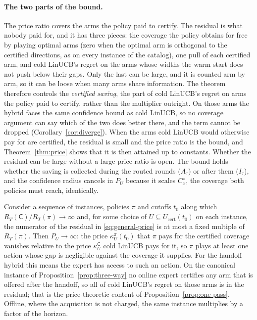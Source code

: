 \documentclass[anon]{alt2027} %
\newcommand{\Cold}{\mathsf{C}}
\begin{document}
\paragraph{The two parts of the bound.}
The price ratio covers the arms the policy paid to certify. The
residual is what nobody paid for, and it has three pieces: the coverage the policy obtains for free by playing optimal arms
(zero when the optimal arm is orthogonal to the certified directions, as on
every instance of the catalog), one pull of each certified arm,
and cold LinUCB's regret on the arms whose widths the warm start does not push
below their gaps. Only the last can be large, and it is counted arm by arm,
so it can be loose when many arms share information. The theorem therefore
controls the \emph{certified saving}, the part of cold LinUCB's regret on arms
the policy paid to certify, rather than the multiplier outright. On those arms the hybrid faces
the same confidence bound as cold LinUCB, so no coverage argument can say
which of the two does better there, and the term cannot be dropped
(Corollary~\ref{cor:diverge}). When the arms cold LinUCB would
otherwise pay for are certified, the residual is small and the price ratio is
the bound, and Theorem~\ref{thm:price} shows that it is then attained up to
constants.
Whether the residual can be large without a large price ratio is open. The
bound holds whether the saving is collected during the routed rounds
($A_\tau$) or after them ($I_\tau$), and the confidence radius cancels in
$P_U$ because it scales $C^\star_x$, the coverage both policies must reach,
identically.

\begin{corollary}
\label{cor:diverge}
Consider a sequence of instances, policies $\pi$ and cutoffs $t_0$ along
which $R_T(\Cold)/R_T(\pi)\to\infty$ and, for some choice of
$U\subseteq U_{\mathrm{cert}}(t_0)$ on each instance, the numerator of the
residual in \eqref{eq:general-price} is at most a fixed multiple of $R_T(\pi)$.
Then $P_U\to\infty$: the price $\kappa^\pi_U(t_0)$ that $\pi$ pays for the certified
coverage vanishes relative to the price $\kappa^{\Cold}_U$ cold LinUCB pays for it, so
$\pi$ plays at least one action whose gap is negligible against the coverage it supplies.
For the handoff hybrid this means the expert has access to such an action.
On the canonical instance of Proposition~\ref{prop:three-way} no online expert
certifies any arm that is offered after the handoff, so all of cold LinUCB's
regret on those arms is in the residual; that is the price-theoretic content of
Proposition~\ref{prop:one-pass}. Offline, where the acquisition is not
charged, the same instance multiplies by a factor of the horizon.
\end{corollary}
\end{document}
